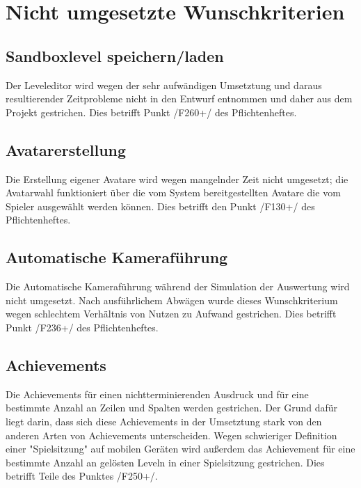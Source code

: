 \chapter{Nicht umgesetzte Wunschkriterien}

\section{Sandboxlevel speichern/laden}
	Der Leveleditor wird wegen der sehr aufwändigen Umsetztung und daraus resultierender Zeitprobleme 
nicht in den Entwurf entnommen und daher aus dem Projekt gestrichen. Dies betrifft Punkt /F260+/ des Pflichtenheftes.  
 
\section{Avatarerstellung}
Die Erstellung eigener Avatare wird wegen mangelnder Zeit nicht umgesetzt; die Avatarwahl funktioniert 
über die vom System bereitgestellten Avatare die vom Spieler ausgewählt werden können. Dies betrifft 
den Punkt /F130+/ des Pflichtenheftes.  

\section{Automatische Kameraführung}
Die Automatische Kameraführung während der Simulation der Auswertung wird nicht umgesetzt. Nach 
ausführlichem Abwägen wurde dieses Wunschkriterium wegen schlechtem Verhältnis von Nutzen zu Aufwand 
gestrichen. Dies betrifft Punkt /F236+/ des Pflichtenheftes. 

\section{Achievements}
Die Achievements für einen nichtterminierenden Ausdruck und für eine bestimmte Anzahl an Zeilen und Spalten 
werden gestrichen. Der Grund dafür liegt darin, dass sich diese Achievements in der Umsetztung stark von den
anderen Arten von Achievements unterscheiden. Wegen schwieriger Definition einer "Spielsitzung" auf mobilen Geräten wird außerdem das Achievement für eine bestimmte Anzahl an gelösten Leveln in einer Spielsitzung gestrichen.
Dies betrifft Teile des Punktes /F250+/.  